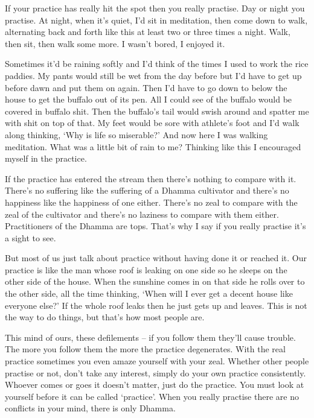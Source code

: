 If your practice has really hit the spot then you really practise. Day or night you practise. At night, when it's quiet, I'd sit in meditation, then come down to walk, alternating back and forth like this at least two or three times a night. Walk, then sit, then walk some more. I wasn't bored, I enjoyed it.

Sometimes it'd be raining softly and I'd think of the times I used to work the rice paddies. My pants would still be wet from the day before but I'd have to get up before dawn and put them on again. Then I'd have to go down to below the house to get the buffalo out of its pen. All I could see of the buffalo would be covered in buffalo shit. Then the buffalo's tail would swish around and spatter me with shit on top of that. My feet would be sore with athlete's foot and I'd walk along thinking, `Why is life so miserable?' And now here I was walking meditation. What was a little bit of rain to me? Thinking like this I encouraged myself in the practice.

If the practice has entered the stream then there's nothing to compare with it. There's no suffering like the suffering of a Dhamma cultivator and there's no happiness like the happiness of one either. There's no zeal to compare with the zeal of the cultivator and there's no laziness to compare with them either. Practitioners of the Dhamma are tops. That's why I say if you really practise it's a sight to see.

But most of us just talk about practice without having done it or reached it. Our practice is like the man whose roof is leaking on one side so he sleeps on the other side of the house. When the sunshine comes in on that side he rolls over to the other side, all the time thinking, `When will I ever get a decent house like everyone else?' If the whole roof leaks then he just gets up and leaves. This is not the way to do things, but that's how most people are.

This mind of ours, these defilements -- if you follow them they'll cause trouble. The more you follow them the more the practice degenerates. With the real practice sometimes you even amaze yourself with your zeal. Whether other people practise or not, don't take any interest, simply do your own practice consistently. Whoever comes or goes it doesn't matter, just do the practice. You must look at yourself before it can be called `practice'. When you really practise there are no conflicts in your mind, there is only Dhamma.

